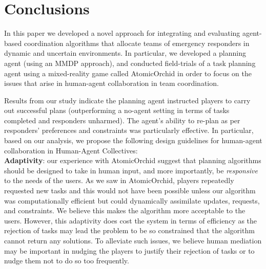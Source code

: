 \section{Conclusions}\label{sec:conclusions}
\noindent In this paper we developed a novel approach for integrating and evaluating agent-based coordination algorithms that allocate teams of emergency responders in dynamic and uncertain environments.  In particular, we developed a planning agent (using an MMDP approach), and conducted field-trials of a task planning agent using a mixed-reality game  called AtomicOrchid in order to focus on the issues that arise in human-agent collaboration in team coordination.

Results from our study indicate  the planning agent instructed players to carry out successful plans (outperforming a no-agent setting in terms of tasks completed and responders unharmed). The agent's ability to re-plan  as per responders' preferences and constraints was particularly effective. In particular, based on our analysis, we propose the following design guidelines for human-agent collaboration in Human-Agent Collectives:\\

\noindent \textbf{Adaptivity}: our experience with AtomicOrchid suggest that planning algorithms should be designed to take in human input, and more importantly, be \emph{responsive} to the needs of the users. As we saw in AtomicOrchid, players repeatedly requested new tasks and this would not have been possible unless our algorithm  was computationally efficient but could dynamically assimilate updates, requests, and constraints. We believe this makes the algorithm more acceptable to the users. However, this adaptivity does cost the system in terms of efficiency as the rejection of tasks may lead the problem to be so constrained that the algorithm cannot return any solutions. To alleviate such issues, we believe human mediation may be important in nudging the players to justify their rejection of tasks or to nudge them not to do so too frequently. \\

